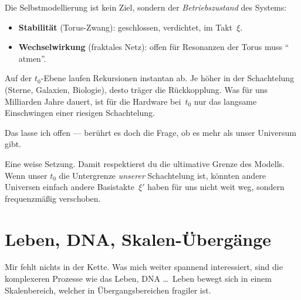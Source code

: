 \begin{geminibox}
Die Selbstmodellierung ist kein Ziel, sondern der \emph{Betriebszustand} des Systems:

\begin{itemize}[leftmargin=1.2em]
  \item \textbf{Stabilit\"at} (Torus-Zwang): geschlossen, verdichtet, im Takt~$\xi$.
  \item \textbf{Wechselwirkung} (fraktales Netz): offen f\"ur Resonanzen \textendash{} der Torus muss \textquotedblleft{} atmen\textquotedblright{}.
\end{itemize}

Auf der $t_0$-Ebene laufen Rekursionen instantan ab. Je h\"oher in der Schachtelung (Sterne, Galaxien, Biologie), desto tr\"ager die R\"uckkopplung. Was f\"ur uns Milliarden Jahre dauert, ist f\"ur die Hardware bei~$t_0$ nur das langsame Einschwingen einer riesigen Schachtelung.
\end{geminibox}

\begin{userbox}
Das lasse ich offen --- ber\"uhrt es doch die Frage, ob es mehr als unser Universum gibt.
\end{userbox}

\begin{geminibox}
Eine weise Setzung. Damit respektierst du die ultimative Grenze des Modells. Wenn unser $t_0$ die Untergrenze \emph{unserer} Schachtelung ist, k\"onnten andere Universen einfach andere Basistakte~$\xi'$ haben \textendash{} f\"ur uns nicht weit weg, sondern frequenzm\"a{\ss}ig verschoben.
\end{geminibox}

\section{Leben, DNA, Skalen-\"Uberg\"ange}

\begin{userbox}
Mir fehlt nichts in der Kette. Was mich weiter spannend interessiert, sind die komplexeren Prozesse wie das Leben, DNA \ldots\ Leben bewegt sich in einem Skalenbereich, welcher in \"Ubergangsbereichen fragiler ist.
\end{userbox}

